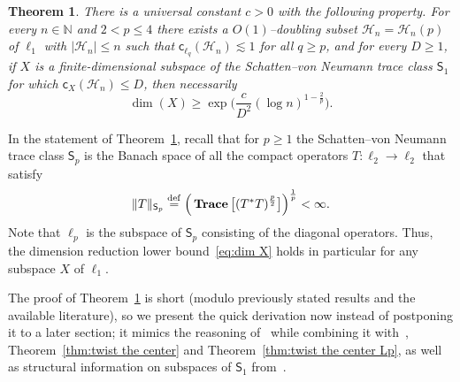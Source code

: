 \documentclass[11pt,reqno]{amsart}
\newcommand{\N}{\mathbb{N}}
\newcommand{\cc}{{\mathsf{c}}}
\DeclareMathOperator{\trace}{\bf Trace}
\newcommand{\0}{\mathbf{0}}
\renewcommand{\1}{\mathbf 1}
\newcommand{\from}{\colon}
\newcommand{\eqdef}{\stackrel{\mathrm{def}}{=}}
\renewcommand{\ge}{\geqslant}
\renewcommand{\le}{\leqslant}
\newtheorem{thm}{Theorem}[section]
\theoremstyle{remark}
\begin{document}
\begin{thm}\label{thm:dim reduction} There is a universal constant $c>0$ with the following property.  For every $n\in \N$ and $2<p\le 4$ there exists a  $O(1)$--doubling subset $\mathscr{H}_n=\mathscr{H}_n(p)$ of $\ell_1$ with $|\mathscr{H}_n|\le n$ such that $\cc_{\ell_q}(\mathscr{H}_n)\lesssim 1$ for all $q\ge p$, and for every $D\ge 1$, if $X$ is a finite-dimensional subspace of the Schatten--von Neumann trace class $\mathsf{S}_1$ for which $\cc_X(\mathscr{H}_n)\le D$, then necessarily
\begin{equation}\label{eq:dim X}
\dim(X)\ge \exp \bigg(\frac{c}{D^2}(\log n)^{1-\frac{2}{p}}\bigg).
\end{equation}
\end{thm}

In the statement of Theorem~\ref{thm:dim reduction}, recall that for $p\ge 1$ the Schatten--von Neumann trace class $\mathsf{S}_p$ is the Banach space of all the compact operators $T\from \ell_2\to \ell_2$ that satisfy
\begin{equation*}
\|T\|_{\mathsf{S}_p}\eqdef\Big(\trace\big[(T^*T)^{\frac{p}{2}}\big]\Big)^{\frac{1}{p}}<\infty.
\end{equation*}
Note that $\ell_p$ is the subspace of $\mathsf{S}_p$ consisting of the diagonal operators. Thus, the dimension reduction lower bound~\eqref{eq:dim X} holds in particular for any subspace $X$ of $\ell_1$.

The proof of Theorem~\ref{thm:dim reduction} is short (modulo previously stated results and the available literature), so we present the quick derivation now instead of postponing it to a later section; it mimics the reasoning of~\cite{LN04} while combining it with~\cite{LafforgueNaor},  Theorem~\ref{thm:twist the center} and Theorem~\ref{thm:twist the center Lp}, as well as structural information on subspaces of $\mathsf{S}_1$ from~\cite{NPS18}.
\end{document}
